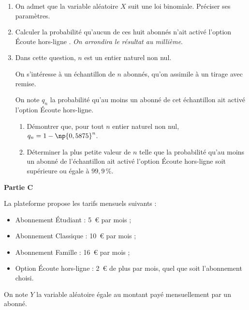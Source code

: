 \begin{enumerate}
\item On admet que la variable aléatoire $X$ suit une loi binomiale. Préciser ses paramètres.
\item Calculer la probabilité qu'aucun de ces huit abonnés n'ait activé l'option \og Écoute hors-ligne \fg{}. \emph{On arrondira le résultat au millième}.
\item Dans cette question, $n$ est un entier naturel non nul.

On s'intéresse à un échantillon de $n$ abonnés, qu'on assimile à un tirage avec remise.

On note $q_{n}$ la probabilité qu'au moins un abonné de cet échantillon ait activé l'option \og Écoute hors-ligne\fg{}.

	\begin{enumerate}
		\item Démontrer que, pour tout $n$ entier naturel non nul,\quad $q_{n}=1- \np{0,5875}^{n}$.
		\item Déterminer la plus petite valeur de $n$ telle que la probabilité qu'au moins un abonné de l'échantillon ait activé l'option \og Écoute hors-ligne\fg{} soit supérieure ou égale à $99,9\,\%$.
	\end{enumerate}
\end{enumerate}

\textbf{Partie C}

La plateforme propose les tarifs mensuels suivants :

\begin{itemize}
\item Abonnement \og Étudiant\fg{} : 5~\euro{} par mois ;
\item Abonnement \og Classique\fg{} : 10~\euro{} par mois ;
\item Abonnement \og Famille \fg{} : 16~\euro{} par mois ;
\item Option \og Écoute hors-ligne\fg{} : 2~\euro{} de plus par mois, quel que soit l'abonnement choisi.
\end{itemize}

On note $Y$ la variable aléatoire égale au montant payé mensuellement par un abonné.

